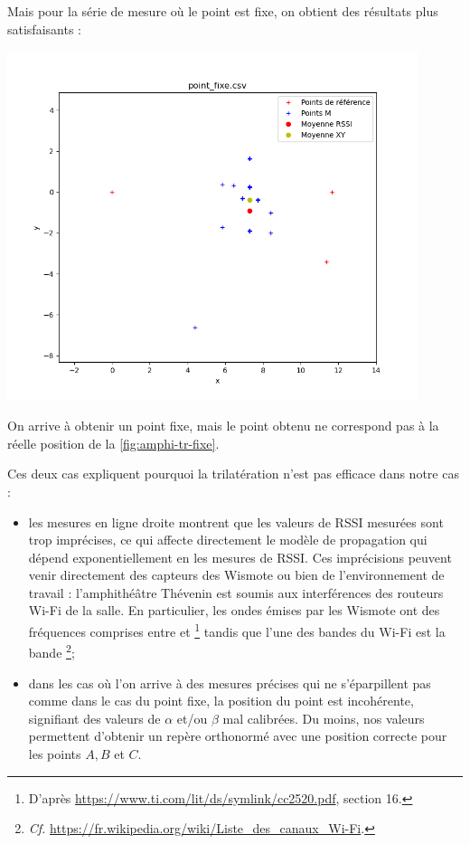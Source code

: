 \documentclass[french, a4paper, 12pt, parskip]{scrartcl}
\begin{document}
Mais pour la série de mesure où le point est fixe, on obtient des résultats
plus satisfaisants :
\begin{center}
  \includegraphics[width=0.9\textwidth]{trilat3.png}
\end{center}
On arrive à obtenir un point fixe, mais le point obtenu ne correspond pas à la
réelle position de la \autoref{fig:amphi-tr-fixe}.

Ces deux cas expliquent pourquoi la trilatération n'est pas efficace dans notre
cas :
\begin{itemize}
  \item les mesures en ligne droite montrent que les valeurs de RSSI mesurées
    sont trop imprécises, ce qui affecte directement le modèle de propagation
    qui dépend exponentiellement en les mesures de RSSI. Ces imprécisions
    peuvent venir directement des capteurs des Wismote ou bien de
    l'environnement de travail : l'amphithéâtre Thévenin est soumis aux
    interférences des routeurs Wi-Fi de la salle. En particulier, les ondes
    émises par les Wismote ont des fréquences comprises entre  et
     \footnote{D'après
    \url{https://www.ti.com/lit/ds/symlink/cc2520.pdf}, section 16.} tandis que
    l'une des bandes du Wi-Fi est la bande  \footnote{\textit{Cf.}
    \url{https://fr.wikipedia.org/wiki/Liste_des_canaux_Wi-Fi}.}; 
  \item dans les cas où l'on arrive à des mesures précises qui ne s'éparpillent
    pas comme dans le cas du point fixe, la position du point est incohérente,
    signifiant des valeurs de $\alpha$ et/ou $\beta$ mal calibrées. Du moins,
    nos valeurs permettent d'obtenir un repère orthonormé avec une position
    correcte pour les points $A, B$ et $C$.
\end{itemize}
\end{document}
